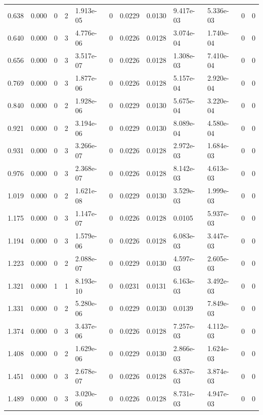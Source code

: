 \documentclass[preview]{standalone}
\begin{document}
{{\begin{tabular}{L{1.2cm}C{1.2cm} C{0.3cm}C{0.5cm} C{1.4cm}C{1.4cm} C{1.4cm}C{1.4cm} C{1.6cm}C{1.6cm} C{1.6cm}C{1.6cm}}
  0.638  &  0.000  & 0     &  2 &  1.913e-05  & 0  &  0.0229&   0.0130& 9.417e-03 & 5.336e-03   &  0 & 0  \\ 
  0.640  &  0.000  & 0     &  3 &  4.776e-06  & 0  &  0.0226&   0.0128& 3.074e-04 & 1.740e-04   &  0 & 0  \\ 
  0.656  &  0.000  & 0     &  3 &  3.517e-07  & 0  &  0.0226&   0.0128& 1.308e-03 & 7.410e-04   &  0 & 0  \\ 
  0.769  &  0.000  & 0     &  3 &  1.877e-06  & 0  &  0.0226&   0.0128& 5.157e-04 & 2.920e-04   &  0 & 0  \\ 
  0.840  &  0.000  & 0     &  2 &  1.928e-06  & 0  &  0.0229&   0.0130& 5.675e-04 & 3.220e-04   &  0 & 0  \\ 
  0.921  &  0.000  & 0     &  2 &  3.194e-06  & 0  &  0.0229&   0.0130& 8.089e-04 & 4.580e-04   &  0 & 0  \\ 
  0.931  &  0.000  & 0     &  3 &  3.266e-07  & 0  &  0.0226&   0.0128& 2.972e-03 & 1.684e-03   &  0 & 0  \\ 
  0.976  &  0.000  & 0     &  3 &  2.368e-07  & 0  &  0.0226&   0.0128& 8.142e-03 & 4.613e-03   &  0 & 0  \\ 
  1.019  &  0.000  & 0     &  2 &  1.621e-08  & 0  &  0.0229&   0.0130& 3.529e-03 & 1.999e-03   &  0 & 0  \\ 
  1.175  &  0.000  & 0     &  3 &  1.147e-07  & 0  &  0.0226&   0.0128& 0.0105 & 5.937e-03   &  0 & 0  \\ 
  1.194  &  0.000  & 0     &  3 &  1.579e-06  & 0  &  0.0226&   0.0128& 6.083e-03 & 3.447e-03   &  0 & 0  \\ 
  1.223  &  0.000  & 0     &  2 &  2.088e-07  & 0  &  0.0229&   0.0130& 4.597e-03 & 2.605e-03   &  0 & 0  \\ 
  1.321  &  0.000  & 1     &  1 &  8.193e-10  & 0  &  0.0231&   0.0131& 6.163e-03 & 3.492e-03   &  0 & 0  \\ 
  1.331  &  0.000  & 0     &  2 &  5.280e-06  & 0  &  0.0229&   0.0130& 0.0139 & 7.849e-03   &  0 & 0  \\ 
  1.374  &  0.000  & 0     &  3 &  3.437e-06  & 0  &  0.0226&   0.0128& 7.257e-03 & 4.112e-03   &  0 & 0  \\ 
  1.408  &  0.000  & 0     &  2 &  1.629e-06  & 0  &  0.0229&   0.0130& 2.866e-03 & 1.624e-03   &  0 & 0  \\ 
  1.451  &  0.000  & 0     &  3 &  2.678e-07  & 0  &  0.0226&   0.0128& 6.837e-03 & 3.874e-03   &  0 & 0  \\ 
  1.489  &  0.000  & 0     &  3 &  3.020e-06  & 0  &  0.0226&   0.0128& 8.731e-03 & 4.947e-03   &  0 & 0  \\ 

\end{tabular}}}
\end{document}
